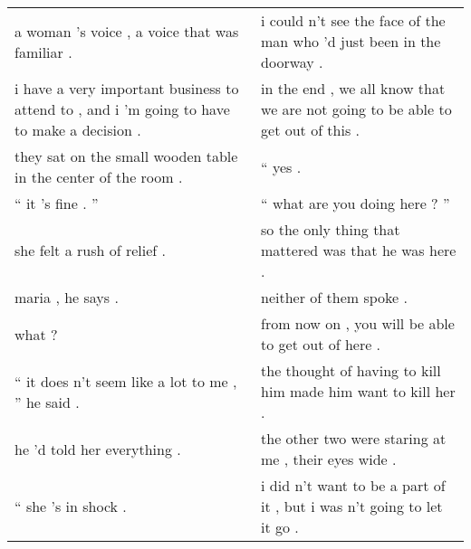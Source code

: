 \documentclass{article}
\begin{document}
\begin{table}[!h]
\begin{center}
{\begin{small}
\begin{tabular}{ll}
                                       a woman 's voice , a voice that was familiar .                              &                               i could n't see the face of the man who 'd just been in the doorway .                        \\
    i have a very important business to attend to , and i 'm going to have to make a decision .                    &                          in the end , we all know that we are not going to be able to get out of this .                    \\
                          they sat on the small wooden table in the center of the room .                           &                                                                              `` yes .                                      \\
                                                              `` it 's fine . ''                                   &                                                            `` what are you doing here ? ''                                 \\
                                                      she felt a rush of relief .                                  &                                         so the only thing that mattered was that he was here .                             \\
                                                              maria , he says .                                    &                                                                 neither of them spoke .                                    \\
                                                                      what ?                                       &                                              from now on , you will be able to get out of here .                           \\
                                      `` it does n't seem like a lot to me , '' he said .                          &                                    the thought of having to kill him made him want to kill her .                           \\
                                                     he 'd told her everything .                                   &                                           the other two were staring at me , their eyes wide .                             \\
                                                            `` she 's in shock .                                   &                                  i did n't want to be a part of it , but i was n't going to let it go .                    \\

\end{tabular}
\end{small}}
\end{center}
\end{table}
\end{document}
